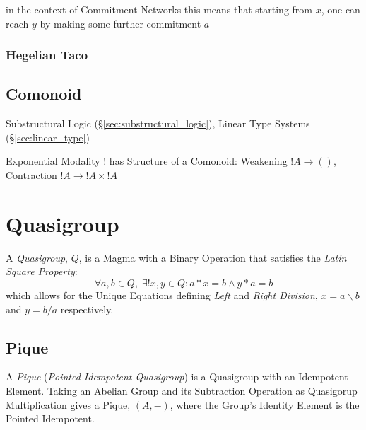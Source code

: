 in the context of Commitment Networks this means that starting from $x$, one
can reach $y$ by making some further commitment $a$



\subsubsection{Hegelian Taco}\label{sec:hegelian_taco}



\subsection{Comonoid}\label{sec:comonoid}

Substructural Logic (\S\ref{sec:substructural_logic}), Linear Type
Systems (\S\ref{sec:linear_type})

Exponential Modality $!$ has Structure of a Comonoid: Weakening $!A
\rightarrow ()$, Contraction $!A \rightarrow !A \times !A$



\section{Quasigroup}\label{sec:quasigroup}

A \emph{Quasigroup}, $Q$, is a Magma with a Binary Operation that satisfies
the \emph{Latin Square Property}:
\[
  \forall a, b \in Q,\;\exists ! x,y \in Q : a * x = b \wedge y * a = b
\]
which allows for the Unique Equations defining \emph{Left} and
\emph{Right Division}, $x = a \backslash b$ and $y = b / a$
respectively.



\subsection{Pique}\label{sec:pique}

A \emph{Pique} (\emph{Pointed Idempotent Quasigroup}) is a Quasigroup
with an Idempotent Element. Taking an Abelian Group and its
Subtraction Operation as Quasigorup Multiplication gives a Pique,
$(A,-)$, where the Group's Identity Element is the Pointed Idempotent.



